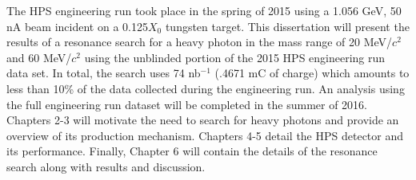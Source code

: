 The HPS engineering run took place in the spring of 2015 using a 1.056 GeV, 50
nA beam incident on a 0.125$X_{0}$ tungsten target.
This dissertation will present the results of a resonance search for a heavy 
photon in the mass range of 20 MeV/$c^2$ and 60 MeV/$c^2$ using the unblinded portion
of the 2015 HPS
engineering run data set.  In total, the search uses 74 nb$^{-1}$
(.4671 mC of charge) which amounts to less than 10\% of the data collected during the engineering run.
An analysis using the full engineering run dataset will be completed in the 
summer of 2016. Chapters 2-3 will motivate the need to search for heavy 
photons and provide an overview of its production mechanism.  Chapters 4-5 
detail the HPS detector and its performance.  Finally, Chapter 6 will contain
the details of the resonance search along with results and discussion.
